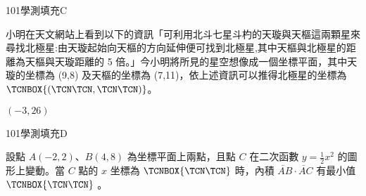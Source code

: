\begin{QUESTIONS}
\begin{QUESTION}
        \begin{QEMPTYSPACE}
        \end{QEMPTYSPACE}
    \end{QUESTION}
    \begin{QUESTION}
        \begin{ExamInfo}{101}{學測}{填充}{C}
        \end{ExamInfo}
        \begin{ExamAnsRateInfo}{56}{90}{65}{13}
        \end{ExamAnsRateInfo}
        \begin{QBODY}
            小明在天文網站上看到以下的資訊「可利用北斗七星斗杓的天璇與天樞這兩顆星來尋找北極星:由天璇起始向天樞的方向延伸便可找到北極星,其中天樞與北極星的距離為天樞與天璇距離的 5 倍。」今小明將所見的星空想像成一個坐標平面，其中天璇的坐標為 (9,8) 及天樞的坐標為 (7,11)，依上述資訊可以推得北極星的坐標為 $\TCNBOX{(\TCN\TCN,\TCN\TCN)}$。
        \end{QBODY}
        \begin{QFROMS}
        \end{QFROMS}
        \begin{QTAGS}\end{QTAGS}
        \begin{QANS}
            $(-3,26)$
        \end{QANS}
        \begin{QSOLLIST}
        \end{QSOLLIST}
        \begin{QEMPTYSPACE}
        \end{QEMPTYSPACE}
    \end{QUESTION}
    \begin{QUESTION}
        \begin{ExamInfo}{101}{學測}{填充}{D}
        \end{ExamInfo}
        \begin{ExamAnsRateInfo}{37}{83}{27}{1}
        \end{ExamAnsRateInfo}
        \begin{QBODY}
            設點 $A(-2,2)$、$B(4,8)$ 為坐標平面上兩點，且點 $C$ 在二次函數 $y = \frac{1}{2}x^2$ 的圖形上變動。當 $C$ 點的 $x$ 坐標為 $\TCNBOX{\TCN\TCN}$ 時，內積 $\lvec{AB}\cdot \lvec{AC}$ 有最小值 $\TCNBOX{\TCN\TCN}$ 。
        \end{QBODY}
        \begin{QFROMS}
        \end{QFROMS}

\end{QUESTION}
\end{QUESTIONS}
